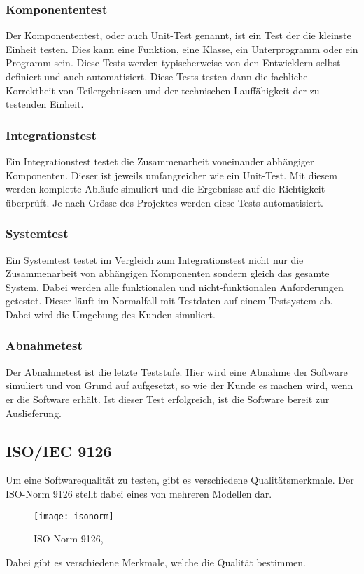 \subsubsection{Komponententest}
Der Komponententest, oder auch Unit-Test genannt, ist ein Test der die kleinste Einheit testen. Dies kann eine Funktion, eine Klasse, ein Unterprogramm oder ein Programm sein. Diese Tests werden typischerweise von den Entwicklern selbst definiert und auch automatisiert. Diese Tests testen dann die fachliche Korrektheit von Teilergebnissen und der technischen Lauffähigkeit der zu testenden Einheit.
\subsubsection{Integrationstest}
Ein Integrationstest testet die Zusammenarbeit voneinander abhängiger Komponenten. Dieser ist jeweils umfangreicher wie ein Unit-Test. Mit diesem werden komplette Abläufe simuliert und die Ergebnisse auf die Richtigkeit überprüft. Je nach Grösse des Projektes werden diese Tests automatisiert.
\subsubsection{Systemtest}
Ein Systemtest testet im Vergleich zum Integrationstest nicht nur die Zusammenarbeit von abhängigen Komponenten sondern gleich das gesamte System. Dabei werden alle funktionalen und nicht-funktionalen Anforderungen getestet. Dieser läuft im Normalfall mit Testdaten auf einem Testsystem ab. Dabei wird die Umgebung des Kunden simuliert.
\subsubsection{Abnahmetest}
Der Abnahmetest ist die letzte Teststufe. Hier wird eine Abnahme der Software simuliert und von Grund auf aufgesetzt, so wie der Kunde es machen wird, wenn er die Software erhält. Ist dieser Test erfolgreich, ist die Software bereit zur Auslieferung.
\subsection{ISO/IEC 9126}
Um eine Softwarequalität zu testen, gibt es verschiedene Qualitätsmerkmale. Der ISO-Norm 9126 stellt dabei eines von mehreren Modellen dar.
\begin{figure}[H]
	\centering
	\texttt{[image: isonorm]}
	\caption{ISO-Norm 9126, \protect{}}
\end{figure}
Dabei gibt es verschiedene Merkmale, welche die Qualität bestimmen.
